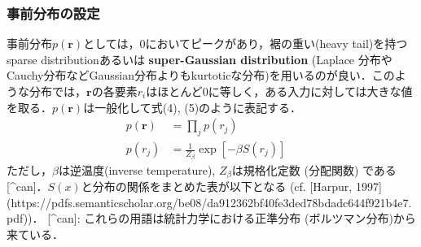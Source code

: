 \subsubsection{事前分布の設定}事前分布$p(\mathbf{r})$としては，0においてピークがあり，裾の重い(heavy tail)を持つsparse distributionあるいは \textbf{super-Gaussian distribution} (Laplace 分布やCauchy分布などGaussian分布よりもkurtoticな分布)を用いるのが良い．このような分布では，$\mathbf{r}$の各要素$r_i$はほとんど0に等しく，ある入力に対しては大きな値を取る．$p(\mathbf{r})$は一般化して式(4), (5)のように表記する．
$$
\begin{align}
p(\mathbf{r})&=\prod_j p(r_j) \quad \tag{4}\\
p(r_j)&=\frac{1}{Z_{\beta}}\exp \left[-\beta S(r_j)\right] \quad \tag{5}
\end{align}
$$
ただし，$\beta$は逆温度(inverse temperature), $Z_{\beta}$は規格化定数 (分配関数) である[^can]．$S(x)$と分布の関係をまとめた表が以下となる (cf. [Harpur, 1997](https://pdfs.semanticscholar.org/be08/da912362bf40fe3ded78bdadc644f921b4e7.pdf))．
[^can]: これらの用語は統計力学における正準分布 (ボルツマン分布)から来ている．